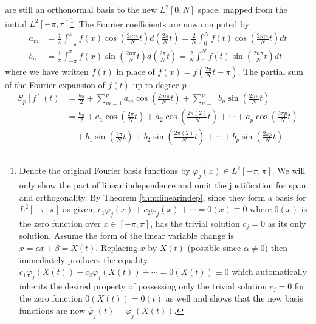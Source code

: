 are still an orthonormal basis to the new $L^2[0, N]$ space, mapped from the initial $L^2[-\pi, \pi]$\footnote{Denote the original Fourier basis functions by $\varphi_j(x) \in L^2[-\pi, \pi]$. We will only show the part of linear independence and omit the justification for span and orthogonality. By Theorem \ref{thm:linearindep}, since they form a basis for $L^2[-\pi, \pi]$ as given, $c_1\varphi_j(x) + c_2\varphi_j(x) + \cdots = 0(x) \equiv 0$ where $0(x)$ is the zero function over $x \in [-\pi,\pi]$, has the trivial solution $c_j = 0$ as its only solution. Assume the form of the linear variable change is $x = \alpha t + \beta = X(t)$. Replacing $x$ by $X(t)$ (possible since $\alpha \neq 0$) then immediately produces the equality $c_1\varphi_j(X(t)) + c_2\varphi_j(X(t)) + \cdots = 0(X(t)) \equiv 0$ which automatically inherits the desired property of possessing only the trivial solution $c_j = 0$ for the zero function $0(X(t)) = 0(t)$ as well and shows that the new basis functions are now $\hat{\varphi}_j(t) = \varphi_j(X(t))$.}. The Fourier coefficients are now computed by 
\begin{subequations}
\begin{align}
a_m &= \frac{1}{\pi} \int_{-\pi}^{\pi} f(x)\cos(\frac{2m\pi}{N}t) d(\frac{2\pi}{N}t) = \frac{2}{N} \int_{0}^{N} f(t)\cos(\frac{2m\pi}{N}t) dt \label{eqn:fouriersca} \\
b_n &= \frac{1}{\pi} \int_{-\pi}^{\pi} f(x)\sin(\frac{2n\pi}{N}t) d(\frac{2\pi}{N}t) = \frac{2}{N} \int_{0}^{N} f(t)\sin(\frac{2n\pi}{N}t) dt \label{eqn:fourierscb}
\end{align}   
\end{subequations}
where we have written $f(t)$ in place of $f(x) = f(\frac{2\pi}{N}t - \pi)$. The partial sum of the Fourier expansion of $f(t)$ up to degree $p$
\begin{subequations}
\begin{align}
S_p[f](t) &= \frac{a_0}{2} + \sum_{m=1}^{p} a_m \cos(\frac{2m\pi}{N}t) + \sum_{n=1}^{p} b_n \sin(\frac{2n\pi}{N}t) \label{eqn:fourierpart} \\
&= \frac{a_0}{2} + a_1 \cos(\frac{2\pi}{N}t) + a_2 \cos(\frac{2\pi(2)}{N}t) + \cdots + a_p \cos(\frac{2\pi p}{N}t) \nonumber \\
&\quad + b_1 \sin(\frac{2\pi}{N}t) + b_2 \sin(\frac{2\pi(2)}{N}t) + \cdots + b_p \sin(\frac{2\pi p}{N}t) 
\end{align}
\end{subequations}
